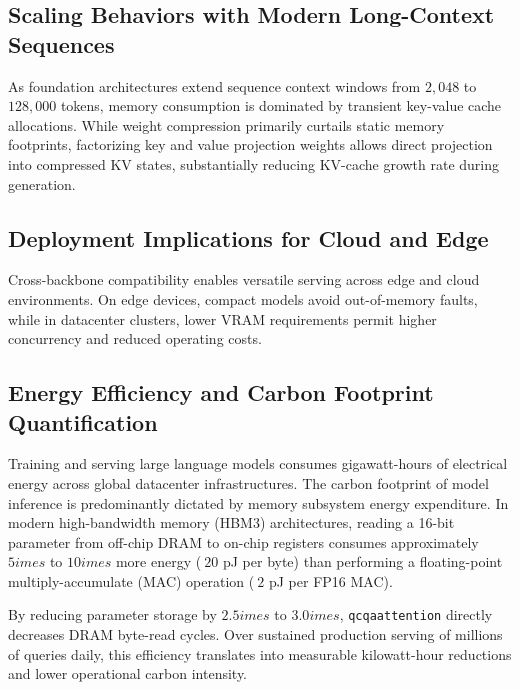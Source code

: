 \subsection{Scaling Behaviors with Modern Long-Context Sequences}
As foundation architectures extend sequence context windows from $2{,}048$ to $128{,}000$ tokens, memory consumption is dominated by transient key-value cache allocations. While weight compression primarily curtails static memory footprints, factorizing key and value projection weights allows direct projection into compressed KV states, substantially reducing KV-cache growth rate during generation.

\subsection{Deployment Implications for Cloud and Edge}
Cross-backbone compatibility enables versatile serving across edge and cloud environments. On edge devices, compact models avoid out-of-memory faults, while in datacenter clusters, lower VRAM requirements permit higher concurrency and reduced operating costs.

\subsection{Energy Efficiency and Carbon Footprint Quantification}
Training and serving large language models consumes gigawatt-hours of electrical energy across global datacenter infrastructures. The carbon footprint of model inference is predominantly dictated by memory subsystem energy expenditure. In modern high-bandwidth memory (HBM3) architectures, reading a 16-bit parameter from off-chip DRAM to on-chip registers consumes approximately $5	imes$ to $10	imes$ more energy ($~20$ pJ per byte) than performing a floating-point multiply-accumulate (MAC) operation ($~2$ pJ per FP16 MAC).

By reducing parameter storage by $2.5	imes$ to $3.0	imes$, \texttt{qcqaattention} directly decreases DRAM byte-read cycles. Over sustained production serving of millions of queries daily, this efficiency translates into measurable kilowatt-hour reductions and lower operational carbon intensity.

